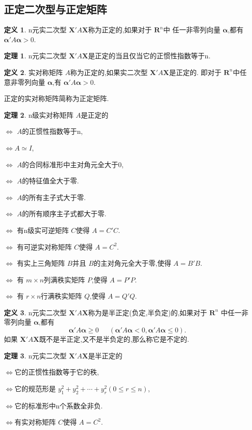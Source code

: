 \documentclass[a4paper,11pt]{article}%
\theoremstyle{remark}
\theoremstyle{definition}
\newtheorem{theorem}{定理}[section]
\theoremstyle{definition}
\newtheorem*{definition}{定义}
\theoremstyle{plain}
\begin{document}
\subsection{正定二次型与正定矩阵}
\begin{definition}
    n元实二次型 $\mathbf{X}'A\mathbf{X}$称为正定的,如果对于 $\mathbf{R}^n$中
    任一非零列向量 $\bm{\alpha}$,都有 $\bm{\alpha}'A \bm{\alpha}>0$.
\end{definition}
\begin{theorem}
    n元实二次型 $\mathbf{X}'A\mathbf{X}$是正定的当且仅当它的正惯性指数等于n.
\end{theorem}
\begin{definition}
    实对称矩阵 $A$称为正定的,如果实二次型 $\mathbf{X}'A\mathbf{X}$是正定的.
    即对于 $\mathbf{R}^n$中任意非零列向量 $\bm{\alpha}$,有 $\bm{\alpha}'A \bm{\alpha}>0$.
\end{definition}
正定的实对称矩阵简称为正定矩阵.
\begin{theorem}
    n级实对称矩阵 $A$是正定的

    $\Leftrightarrow$ $A$的正惯性指数等于n,

    $\Leftrightarrow A\simeq I$,

    $\Leftrightarrow$ $A$的合同标准形中主对角元全大于0,

    $\Leftrightarrow$ $A$的特征值全大于零.

    $\Leftrightarrow$ $A$的所有主子式大于零.

    $\Leftrightarrow$ $A$的所有顺序主子式都大于零.

    $\Leftrightarrow$ 有n级实可逆矩阵 $C$使得 $A=C'C$.

    $\Leftrightarrow$ 有可逆实对称矩阵 $C$使得 $A=C^2$.

    $\Leftrightarrow$ 有实上三角矩阵 $B$并且 $B$的主对角元全大于零,使得 $A=B'B$.

    $\Leftrightarrow$ 有 $m\times n$列满秩实矩阵 $P$,使得 $A=P'P.$

    $\Leftrightarrow$ 有 $r\times n$行满秩实矩阵 $Q$,使得 $A=Q'Q$.
\end{theorem}
\begin{definition}
    n元实二次型 $\mathbf{X}'A\mathbf{X}$称为是半正定(负定,半负定)的,如果对于 $\mathbf{R}^n$
    中任一非零列向量 $\bm{\alpha}$,都有
    \[\bm{\alpha}'A \bm{\alpha}\geq 0\phantom{111}(\bm{\alpha}'A \bm{\alpha}<0,\bm{\alpha}'A \bm{\alpha}\leq 0).\]
    如果 $\mathbf{X}'A\mathbf{X}$既不是半正定,又不是半负定的,那么称它是不定的.
\end{definition}
\begin{theorem}
    n元实二次型 $\mathbf{X}'A\mathbf{X}$是半正定的

    $\Leftrightarrow$它的正惯性指数等于它的秩,

    $\Leftrightarrow$它的规范形是 $y^2_1+y^2_2+\cdots+y^2_r(0\leq r\leq n)$,

    $\Leftrightarrow$它的标准形中n个系数全非负.

    $\Leftrightarrow$有实对称矩阵 $C$使得 $A=C^2.$
\end{theorem}
\end{document}
